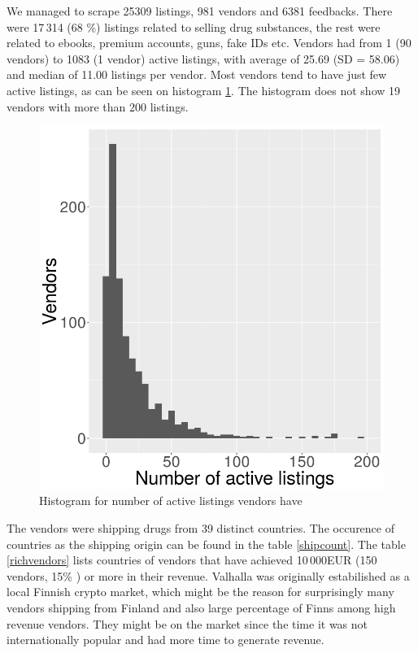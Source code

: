 \documentclass[
  digital, %
  table,   %
  lof,     %
  lot,     %
  oneside
]{fithesis3}
\begin{document}
We managed to scrape 25309 listings, 981 vendors and 6381 feedbacks.
There were 17\,314 (68 \%) listings related to selling drug substances, the rest
were related to ebooks, premium accounts, guns, fake IDs etc.
Vendors had from 1 (90 vendors) to 1083 (1 vendor)
active listings, with average of 25.69 (SD = 58.06)
and median of 11.00 listings per vendor.
Most vendors tend to have just few active listings,
as can be seen on histogram \ref{listingsxsellers}.
The histogram does not show 19 vendors with more than 200 listings.

\begin{figure}[!htb]
    \centering
    \includegraphics[scale=0.6]{listingsxsellers}
    \centering
    \caption{Histogram for number of active listings vendors have}
    \label{listingsxsellers}
\end{figure}

The vendors were shipping drugs from 39 distinct countries.
The occurence of countries as the shipping origin can be found in the table \ref{shipcount}.
The table \ref{richvendors} lists countries of vendors that have achieved 10\,000EUR (150 vendors, 15\% ) or more in their revenue.
Valhalla was originally estabilished as a local Finnish crypto market,
which might be the reason for surprisingly many vendors shipping from Finland and also large percentage
of Finns among high revenue vendors. They might be on the market since
the time it was not internationally popular and had more time to generate revenue.
\end{document}
